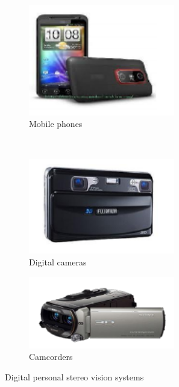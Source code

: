 \begin{figure}[h!]
\centering
\begin{subfigure}[]{0.4\textwidth}
\centering
\includegraphics[width=0.7\textwidth]{./img/devices1.png}
\caption{\scriptsize{Mobile phones}}
\end{subfigure}%
~ %
\begin{subfigure}[]{0.25\textwidth}
\centering
\includegraphics[width=0.7\textwidth]{./img/devices2.png}
\caption{\scriptsize{Digital cameras}}
\end{subfigure} 
\begin{subfigure}[]{0.4\textwidth}
\centering
\includegraphics[width=0.7\textwidth]{./img/devices3.png}
\caption{\scriptsize{Camcorders}}
\label{disparity}
\end{subfigure}%
\caption{\small{Digital personal stereo vision systems}}
\end{figure}
